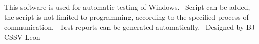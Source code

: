 This software is used for automatic testing of Windows.~\newline
 Script can be added, the script is not limited to programming, according to the specified process of communication.~\newline
 Test reports can be generated automatically.~\newline
 Designed by BJ C\+S\+SV Leon 